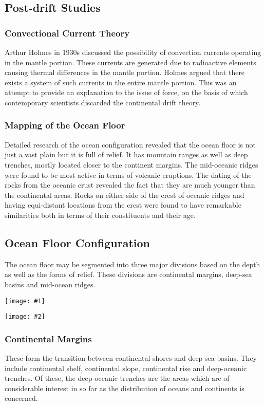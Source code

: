 \documentclass[8pt, a4paper, oneside, twocolumn]{extarticle}
\newcommand{\iph}[2]{
    \texttt{[image: \#2]}
}
\newcommand{\ph}[1]{
    \texttt{[image: \#1]}
}
\begin{document}
\subsection{Post-drift Studies}
\subsubsection{Convectional Current Theory}
Arthur Holmes in 1930s discussed the possibility of convection currents operating in the mantle portion. These currents are generated due to radioactive elements causing thermal differences in the mantle portion. Holmes argued that there exists a system of such currents in the entire mantle portion. This was an attempt to provide an explanation to the issue of force, on the basis of which contemporary scientists discarded the continental drift theory.
\subsubsection{Mapping of the Ocean Floor}
Detailed research of the ocean configuration revealed that the ocean floor is not just a vast plain but it is full of relief. It has mountain ranges as well as deep trenches, mostly located closer to the continent margins. The mid-oceanic ridges were found to be most active in terms of volcanic eruptions. The dating of the rocks from the oceanic crust revealed the fact that they are much younger than the continental areas. Rocks on either side of the crest of oceanic ridges and having equi-distant locations from the crest were found to have remarkable similarities both in terms of their constituents and their age.
\subsection{Ocean Floor Configuration}
The ocean floor may be segmented into three major divisions based on the depth as well as the forms of relief. These divisions are continental margins, deep-sea basins and mid-ocean ridges.

\ph{cs}

\iph{0.35}{cr}

\subsubsection{Continental Margins}
These form the transition between continental shores and deep-sea basins. They include continental shelf, continental slope, continental rise and deep-oceanic trenches. Of these, the deep-oceanic trenches are the areas which are of considerable interest in so far as the distribution of oceans and continents is concerned.
\end{document}
